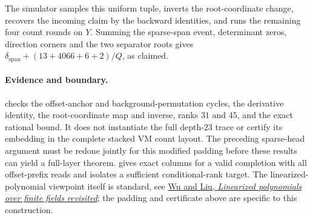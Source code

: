 \documentclass[11pt]{article}
\begin{document}
The simulator samples this uniform tuple, inverts the root-coordinate change, recovers the incoming claim by the backward identities, and runs the remaining four count rounds on $Y$. Summing the sparse-span event, determinant zeros, direction corners and the two separator roots gives $\delta_{\mathrm{span}}+(13+4066+6+2)/Q$, as claimed.

\paragraph{Evidence and boundary.}  checks the offset-anchor and background-permutation cycles, the derivative identity, the root-coordinate map and inverse, ranks $31$ and $45$, and the exact rational bound. It does not instantiate the full depth-$23$ trace or certify its embedding in the complete stacked VM count layout. The preceding sparse-head argument must be redone jointly for this modified padding before these results can yield a full-layer theorem.  gives exact columns for a valid completion with all offset-prefix reads and isolates a sufficient conditional-rank target. The linearized-polynomial viewpoint itself is standard, see \href{https://arxiv.org/abs/1211.5475}{Wu and Liu, \emph{Linearized polynomials over finite fields revisited}}; the padding and certificate above are specific to this construction.
\end{document}
